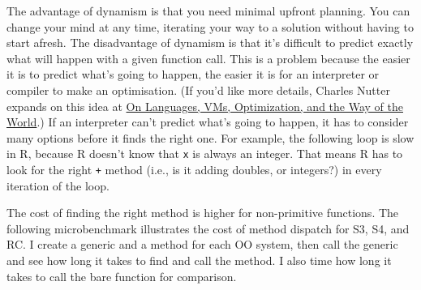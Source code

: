 The advantage of dynamism is that you need minimal upfront planning. You
can change your mind at any time, iterating your way to a solution
without having to start afresh. The disadvantage of dynamism is that
it's difficult to predict exactly what will happen with a given function
call. This is a problem because the easier it is to predict what's going
to happen, the easier it is for an interpreter or compiler to make an
optimisation. (If you'd like more details, Charles Nutter expands on
this idea at
\href{http://blog.headius.com/2013/05/on-languages-vms-optimization-and-way.html}{On
Languages, VMs, Optimization, and the Way of the World}.) If an
interpreter can't predict what's going to happen, it has to consider
many options before it finds the right one. For example, the following
loop is slow in R, because R doesn't know that \texttt{x} is always an
integer. That means R has to look for the right \texttt{+} method (i.e.,
is it adding doubles, or integers?) in every iteration of the loop.

\begin{Shaded}
\begin{Highlighting}[]
\StringTok{ }
 \OperatorTok{:}\NormalTok{) \{}
\StringTok{ }\OperatorTok{+}\StringTok{ }
\NormalTok{\}}
\end{Highlighting}
\end{Shaded}

The cost of finding the right method is higher for non-primitive
functions. The following microbenchmark illustrates the cost of method
dispatch for S3, S4, and RC. I create a generic and a method for each OO
system, then call the generic and see how long it takes to find and call
the method. I also time how long it takes to call the bare function for
comparison. 


